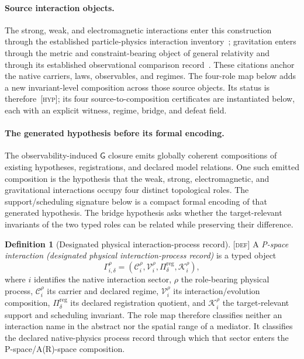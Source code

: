 \documentclass[11pt]{article}
\newcommand{\GOp}{\ensuremath{\mathsf{G}}}
\newcommand{\Defn}{\textsc{[def]}}
\newcommand{\Hyp}{\textsc{[hyp]}}
\theoremstyle{definition}
\newtheorem{sdefinition}{Definition}
\begin{document}
\paragraph{Source interaction objects.}
The strong, weak, and electromagnetic interactions enter this construction through
the established particle-physics interaction inventory~\cite{S_PDG2024}; gravitation
enters through the metric and constraint-bearing object of general relativity
and through its established observational comparison record~\cite{S_Einstein1916,
S_Will2014,S_Berti2015}. These citations anchor the native carriers, laws,
observables, and regimes. The four-role map below adds a new invariant-level
composition across those source objects. Its status is therefore \,\Hyp{}; its
four source-to-composition certificates are instantiated below, each with an
explicit witness, regime, bridge, and defeat field.

\paragraph{The generated hypothesis before its formal encoding.}
The observability-induced $\GOp$ closure emits globally coherent compositions of
existing hypotheses, registrations, and declared model relations. One such emitted
composition is the hypothesis that the weak, strong, electromagnetic, and
gravitational interactions occupy four distinct topological roles. The
support/scheduling signature below is a compact formal encoding of that generated
hypothesis. The bridge hypothesis asks whether the target-relevant invariants of
the two typed roles can be related while preserving their difference.

\begin{sdefinition}[Designated physical interaction-process record]
\label{def:designated-interaction-process-record}
\Defn{} A \emph{P-space interaction (designated physical interaction-process
record)} is a typed object
\begin{equation}
\Gamma_{i,\delta}^{\rho}=
\left(\mathcal C_i^{\rho},\mathcal V_i^{\rho},\Pi_{\delta}^{\mathrm{reg}},
\mathcal K_i^{\rho}\right),
\label{eq:designated-interaction-process-record}
\end{equation}
where $i$ identifies the native interaction sector, $\rho$ the role-bearing
physical process, $\mathcal C_i^{\rho}$ its carrier and declared regime,
$\mathcal V_i^{\rho}$ its interaction/evolution composition,
$\Pi_{\delta}^{\mathrm{reg}}$ its declared registration quotient, and
$\mathcal K_i^{\rho}$ the target-relevant support and scheduling invariant. The
role map therefore classifies neither an interaction name in the abstract nor the
spatial range of a mediator. It classifies the declared native-physics process
record through which that sector enters the P-space/A(R)-space composition.
\end{sdefinition}
\end{document}
